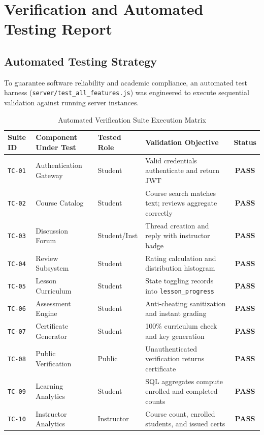 \documentclass[12pt,a4paper]{report}
\begin{document}
\chapter{Verification and Automated Testing Report}

\section{Automated Testing Strategy}
To guarantee software reliability and academic compliance, an automated test harness (\texttt{server/test\_all\_features.js}) was engineered to execute sequential validation against running server instances.

\begin{table}[H]
\centering
\caption{Automated Verification Suite Execution Matrix}
\label{tab:tests}
\begin{tabularx}{\textwidth}{@{}lllXc@{}}
\toprule
\textbf{Suite ID} & \textbf{Component Under Test} & \textbf{Tested Role} & \textbf{Validation Objective} & \textbf{Status} \\ \midrule
\texttt{TC-01} & Authentication Gateway & Student & Valid credentials authenticate and return JWT & \textbf{PASS} \\
\texttt{TC-02} & Course Catalog & Student & Course search matches text; reviews aggregate correctly & \textbf{PASS} \\
\texttt{TC-03} & Discussion Forum & Student/Inst & Thread creation and reply with instructor badge & \textbf{PASS} \\
\texttt{TC-04} & Review Subsystem & Student & Rating calculation and distribution histogram & \textbf{PASS} \\
\texttt{TC-05} & Lesson Curriculum & Student & State toggling records into \texttt{lesson\_progress} & \textbf{PASS} \\
\texttt{TC-06} & Assessment Engine & Student & Anti-cheating sanitization and instant grading & \textbf{PASS} \\
\texttt{TC-07} & Certificate Generator & Student & 100\% curriculum check and key generation & \textbf{PASS} \\
\texttt{TC-08} & Public Verification & Public & Unauthenticated verification returns certificate & \textbf{PASS} \\
\texttt{TC-09} & Learning Analytics & Student & SQL aggregates compute enrolled and completed counts & \textbf{PASS} \\
\texttt{TC-10} & Instructor Analytics & Instructor & Course count, enrolled students, and issued certs & \textbf{PASS} \\ \bottomrule
\end{tabularx}
\end{table}
\end{document}
